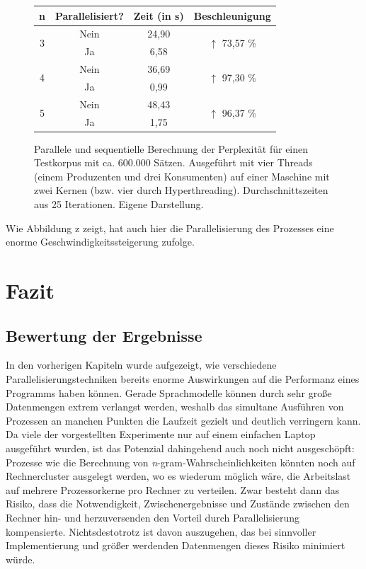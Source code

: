 \documentclass[a4paper,12pt]{scrartcl}
\begin{document}
    \begin{figure}[h]
        \centering
        \begin{tabular}{c|c||c|c}
            n & Parallelisiert? & Zeit (in s) & Beschleunigung \\
            \hline \hline
            \multirow{2}{*}{3} & \textcolor{BrickRed}{Nein} & 24,90 & \multirow{2}{*}{\textcolor{OliveGreen}{$\uparrow$ 73,57 \%}} \\
             & \textcolor{OliveGreen}{Ja} & 6,58 & \\
            \hline
            \multirow{2}{*}{4} & \textcolor{BrickRed}{Nein} & 36,69 & \multirow{2}{*}{\textcolor{OliveGreen}{$\uparrow$ 97,30 \%}} \\
             & \textcolor{OliveGreen}{Ja} & 0,99 & \\
            \hline 
            \multirow{2}{*}{5} & \textcolor{BrickRed}{Nein} & 48,43 & \multirow{2}{*}{\textcolor{OliveGreen}{$\uparrow$ 96,37 \%}} \\
             & \textcolor{OliveGreen}{Ja} & 1,75 & \\
        \end{tabular}
        \caption{Parallele und sequentielle Berechnung der Perplexität für einen Testkorpus mit ca. 600.000 Sätzen. Ausgeführt mit vier Threads (einem Produzenten und drei Konsumenten) auf einer Maschine mit zwei Kernen (bzw. vier durch Hyperthreading). Durchschnittszeiten aus 25 Iterationen. Eigene Darstellung.}
    \end{figure}

    Wie Abbildung z zeigt, hat auch hier die Parallelisierung des Prozesses eine enorme Geschwindigkeitssteigerung zufolge.

\section{Fazit}

    \subsection{Bewertung der Ergebnisse}

    In den vorherigen Kapiteln wurde aufgezeigt, wie verschiedene Parallelisierungstechniken bereits enorme Auswirkungen auf die Performanz eines Programms haben können. Gerade Sprachmodelle können durch sehr große Datenmengen extrem verlangst werden, weshalb das simultane Ausführen von Prozessen an manchen Punkten die Laufzeit gezielt und deutlich verringern kann. \\
    Da viele der vorgestellten Experimente nur auf einem einfachen Laptop ausgeführt wurden, ist das Potenzial dahingehend auch noch nicht ausgeschöpft: Prozesse wie die Berechnung von \emph{n}-gram-Wahrscheinlichkeiten könnten noch auf Rechnercluster ausgelegt werden, wo es wiederum möglich wäre, die Arbeitslast auf mehrere Prozessorkerne pro Rechner zu verteilen. Zwar besteht dann das Risiko, dass die Notwendigkeit, Zwischenergebnisse und Zustände zwischen den Rechner hin- und herzuversenden den Vorteil durch Parallelisierung kompensierte. Nichtsdestotrotz ist davon auszugehen, das bei sinnvoller Implementierung und größer werdenden Datenmengen dieses Risiko minimiert würde.
\end{document}
